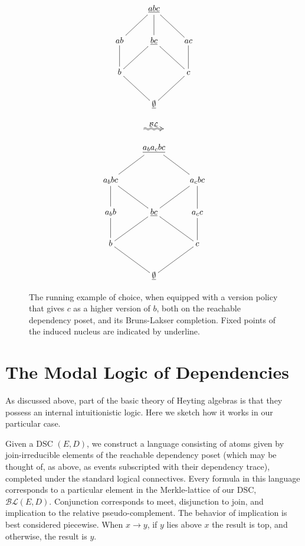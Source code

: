 \documentclass[a4paper,USenglish,cleveref, autoref, thm-restate,authorcolumns]{lipics-v2019}
\newcommand{\BLc}{\mathcal{BL}}
\begin{document}
\begin{figure}
\centering
\begin{minipage}[c]{0.3\textwidth}
\begin{equation*}
    \xymatrix{& \underline{abc} \ar@{-}[dl] \ar@{-}[d] \ar@{-}[dr] & \\
      ab \ar@{-}[d] & \underline{bc} \ar@{-}[dl] \ar@{-}[dr] &
        ac \ar@{-}[d]  \\
        b \ar@{-}[dr] & & c \ar@{-}[dl]         \\
       & \underline{\emptyset} &}
\end{equation*}
\end{minipage}
\begin{minipage}[c]{0.08\textwidth}
  \begin{equation*}
    \xymatrix{\ar@2{~>}[r]^{\BLc} &}
  \end{equation*}
\end{minipage}
\begin{minipage}[c]{0.3\textwidth}
\begin{equation*}
    \xymatrix{& \underline{a_ba_cbc} \ar@{-}[dl]  \ar@{-}[dr] & \\
      a_bbc \ar@{-}[d] \ar@{-}[dr] & &
        a_cbc \ar@{-}[d] \ar@{-}[dl]\\
        a_bb \ar@{-}[d] & \underline{bc} \ar@{-}[dl] \ar@{-}[dr] &
          a_cc \ar@{-}[d] \\
         b \ar@{-}[dr] & & c \ar@{-}[dl] \\
      & \underline{\emptyset} }
\end{equation*}
\end{minipage}
\caption{The running example of choice, when equipped with a version policy that gives \(c\) as a higher version of \(b\), both on the reachable dependency poset, and its Bruns-Lakser completion. Fixed points of the induced nucleus are indicated by underline.}
\label{Fig4}
\end{figure}

\section{The Modal Logic of Dependencies}
As discussed above, part of the basic theory of Heyting algebras is that they possess an internal intuitionistic logic. Here we sketch how it works in our particular case.

Given a DSC \((E,D)\), we construct a language consisting of atoms given by join-irreducible elements of the reachable dependency poset (which may be thought of, as above, as events subscripted with their dependency trace), completed under the standard logical connectives. Every formula in this language corresponds to a particular element in the Merkle-lattice of our DSC, \(\BLc(E,D)\).  Conjunction corresponds to meet, disjunction to join, and implication to the relative pseudo-complement. The behavior of implication is best considered piecewise. When \(x \rightarrow y\), if \(y\) lies above \(x\) the result is top, and otherwise, the result is \(y\).
\end{document}

